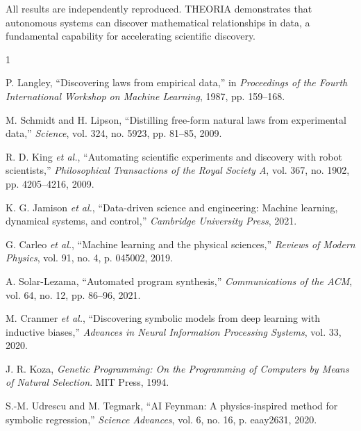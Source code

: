 \documentclass[journal,10pt]{IEEEtran}
\begin{document}
All results are independently reproduced. THEORIA demonstrates that autonomous systems can discover mathematical relationships in data, a fundamental capability for accelerating scientific discovery.

\begin{thebibliography}{1}

P. Langley, ``Discovering laws from empirical data,'' in \textit{Proceedings of the Fourth International Workshop on Machine Learning}, 1987, pp. 159--168.

M. Schmidt and H. Lipson, ``Distilling free-form natural laws from experimental data,'' \textit{Science}, vol. 324, no. 5923, pp. 81--85, 2009.

R. D. King \textit{et al.}, ``Automating scientific experiments and discovery with robot scientists,'' \textit{Philosophical Transactions of the Royal Society A}, vol. 367, no. 1902, pp. 4205--4216, 2009.

K. G. Jamison \textit{et al.}, ``Data-driven science and engineering: Machine learning, dynamical systems, and control,'' \textit{Cambridge University Press}, 2021.

G. Carleo \textit{et al.}, ``Machine learning and the physical sciences,'' \textit{Reviews of Modern Physics}, vol. 91, no. 4, p. 045002, 2019.

A. Solar-Lezama, ``Automated program synthesis,'' \textit{Communications of the ACM}, vol. 64, no. 12, pp. 86--96, 2021.

M. Cranmer \textit{et al.}, ``Discovering symbolic models from deep learning with inductive biases,'' \textit{Advances in Neural Information Processing Systems}, vol. 33, 2020.

J. R. Koza, \textit{Genetic Programming: On the Programming of Computers by Means of Natural Selection}. MIT Press, 1994.

S.-M. Udrescu and M. Tegmark, ``AI Feynman: A physics-inspired method for symbolic regression,'' \textit{Science Advances}, vol. 6, no. 16, p. eaay2631, 2020.

\end{thebibliography}
\end{document}
